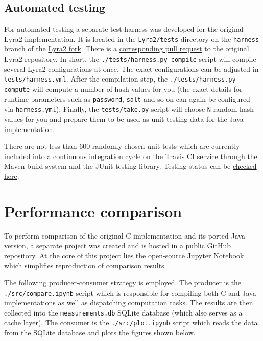 \subsection{Automated testing}

For automated testing a separate test harness was developed for the original Lyra2 implementation. It is located in the \verb|Lyra2/tests| directory on the \verb|harness| branch of the \href{https://github.com/all3fox/Lyra/tree/harness}{Lyra2 fork}. There is a \href{https://github.com/leocalm/Lyra/pull/7}{corresponding pull request} to the original Lyra2 repository. In short, the \texttt{./tests/harness.py compile} script will compile several Lyra2 configurations at once. The exact configurations can be adjusted in \verb|tests/harness.yml|. After the compilation step, the \texttt{./tests/harness.py compute} will compute a number of hash values for you (the exact details for runtime parameters such as \verb|password|, \verb|salt| and so on can again be configured via \verb|harness.yml|). Finally, the \verb|tests/take.py| script will choose \verb|N| random hash values for you and prepare them to be used as unit-testing data for the Java implementation.

There are not less than 600 randomly chosen unit-tests which are currently included into a continuous integration cycle on the Travis CI service through the Maven build system and the JUnit testing library. Testing status can be \href{https://travis-ci.org/all3fox/lyra2-java}{checked here}.

\section{Performance comparison}

To perform comparison of the original C implementation and its ported Java version, a separate project was created and is hosted in \href{https://github.com/all3fox/lyra2-compare}{a public GitHub repository}. At the core of this project lies the open-source \href{https://jupyter.org/}{Jupyter Notebook} which simplifies reproduction of comparison results.

The following producer-consumer strategy is employed. The producer is the \texttt{./src/compare.ipynb} script which is responsible for compiling both C and Java implementations as well as dispatching computation tasks. The results are then collected into the \texttt{measurements.db} SQLite database (which also serves as a cache layer). The consumer is the \texttt{./src/plot.ipynb} script which reads the data from the SQLite database and plots the figures shown below.

